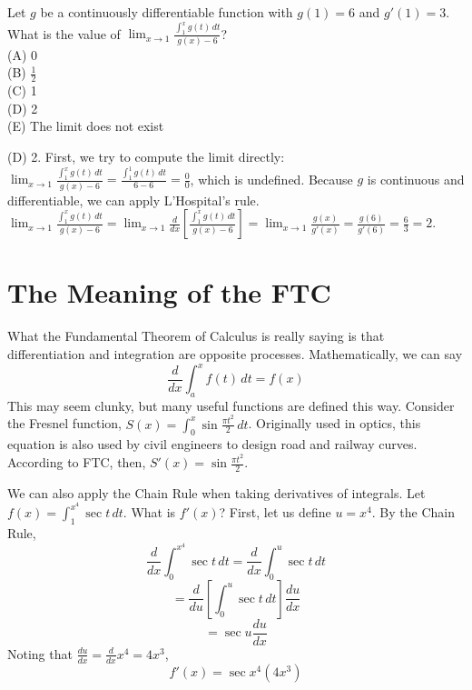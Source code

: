 \begin{Exercise} Let $g$ be a continuously 
differentiable function with $g(1) = 6$ and $g'(1) = 3$. What is the value of 
$\lim_{x \to 1} \frac{\int_1^x g(t)\,dt}{g(x) - 6}$?\\
(A) 0\\
(B) $\frac{1}{2}$\\
(C) 1\\
(D) 2\\
(E) The limit does not exist\\
\vspace{40mm}
\end{Exercise}

\begin{Answer}[ref = defint5]
(D) 2. First, we try to compute the limit directly: $\lim_{x \to 1} \frac{\int_
1^x g(t)\,dt}{g(x) - 6} = \frac{\int_1^1 g(t)\,dt}{6 - 6} = \frac{0}{0}$, 
which is undefined. Because $g$ is continuous and differentiable, we can apply 
L'Hospital's rule. $\lim_{x \to 1} \frac{\int_1^x g(t)\,dt}{g(x) - 6} = \lim_{
x \to 1} \frac{d}{dx} \left[ \frac{\int_1^x g(t)\,dt}{g(x) - 6} \right] = 
\lim_{x \to 1} \frac{g(x)}{g'(x)} = \frac{g(6)}{g'(6)} = \frac{6}{3} = 2$.
\end{Answer}


\section{The Meaning of the FTC}
What the Fundamental Theorem of Calculus is really saying is that 
differentiation and integration are opposite processes. Mathematically, 
we can say $$\frac{d}{dx} \int_{a}^{x} f(t)\,dt = f(x)$$
This may seem clunky, but many useful functions are defined this way. 
Consider the Fresnel function, $S(x) = \int_{0}^{x}\sin{
\frac{\pi t^2}{2}}\,dt$. Originally used in optics, this equation is 
also used by civil engineers to design road and railway curves. 
According to FTC, then, $S'(x) = \sin{\frac{\pi t^2}{2}}$. 

We can also apply the Chain Rule when taking derivatives of integrals. 
Let $f(x) = \int_{1}^{x^4} \sec{t}\,dt$. What is $f'(x)$? First, let 
us define $u = x^4$. By the Chain Rule,
$$\frac{d}{dx}\int_{0}^{x^4} \sec{t}\,dt = \frac{d}{dx}\int_{0}^{u} 
\sec{t}\,dt$$ 
$$= \frac{d}{du}[\int_{0}^{u} \sec{t}\,dt]\frac{du}{dx}$$
$$ = \sec{u} \frac{du}{dx}$$
Noting that $\frac{du}{dx} = \frac{d}{dx}x^4 = 4x^3$, 
$$f'(x) = \sec{x^4}(4x^3)$$

